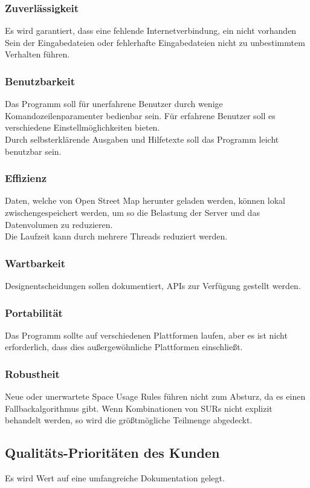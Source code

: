 \subsubsection{Zuverlässigkeit}
Es wird garantiert, dass eine fehlende Internetverbindung, ein nicht vorhanden Sein der Eingabedateien oder fehlerhafte Eingabedateien
nicht zu unbestimmtem Verhalten führen.

\subsubsection{Benutzbarkeit}
Das Programm soll für unerfahrene Benutzer durch wenige Komandozeilenparamenter bedienbar sein. Für erfahrene Benutzer soll es
verschiedene Einstellmöglichkeiten bieten.\\
Durch selbsterklärende Ausgaben und Hilfetexte soll das Programm leicht benutzbar sein.

\subsubsection{Effizienz}
Daten, welche von Open Street Map herunter geladen werden, können lokal zwischengespeichert werden, um so die Belastung der Server und
das Datenvolumen zu reduzieren.\\
Die Laufzeit kann durch mehrere Threads reduziert werden.

\subsubsection{Wartbarkeit}
Designentscheidungen sollen dokumentiert, APIs zur Verfügung gestellt werden.

\subsubsection{Portabilität}
Das Programm sollte auf verschiedenen Plattformen laufen, aber es ist nicht erforderlich, dass dies außergewöhnliche Plattformen einschließt.

\subsubsection{Robustheit}
Neue oder unerwartete Space Usage Rules führen nicht zum Absturz, da es einen Fallbackalgorithmus gibt. Wenn Kombinationen von
SURs nicht explizit behandelt werden, so wird die größtmögliche Teilmenge abgedeckt.

\subsection{Qualitäts-Prioritäten des Kunden}
Es wird Wert auf eine umfangreiche Dokumentation gelegt.
